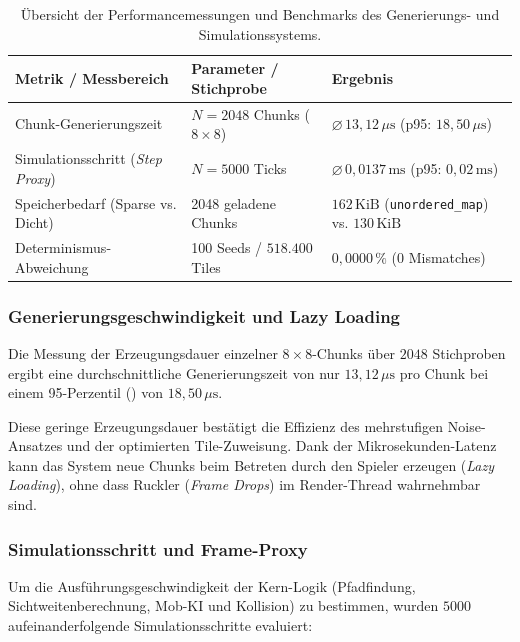 \documentclass[
  a4paper,
  11pt,
  twoside,
  BCOR=8mm,           %
  headings=big,
  numbers=noenddot,
  listof=totoc,       %
  captions=tableheading,
]{scrreprt}
\begin{document}
\begin{table}[htbp]
    \centering
    \caption{Übersicht der Performancemessungen und Benchmarks des Generierungs- und Simulationssystems.}
    \label{tab:performance_summary}
    \small
    \begin{tabular}{|p{3.6cm}|p{4.0cm}|p{5.6cm}|}
        \hline
        \textbf{Metrik / Messbereich} & \textbf{Parameter / Stichprobe} & \textbf{Ergebnis} \\ \hline
        Chunk-Generierungszeit & $N = 2048$ Chunks ($8 \times 8$) & $\varnothing\,13{,}12\,\mu\text{s}$ (p95: $18{,}50\,\mu\text{s}$) \\ \hline
        Simulationsschritt (\textit{Step Proxy}) & $N = 5000$ Ticks & $\varnothing\,0{,}0137\,\text{ms}$ (p95: $0{,}02\,\text{ms}$) \\ \hline
        Speicherbedarf (Sparse vs. Dicht) & 2048 geladene Chunks & $162\,\text{KiB}$ (\texttt{unordered\_map}) vs. $130\,\text{KiB}$ \\ \hline
        Determinismus-Abweichung & 100 Seeds / $518.400$ Tiles & $0{,}0000\,\%$ (0 Mismatches) \\ \hline
    \end{tabular}
\end{table}

\subsubsection{Generierungsgeschwindigkeit und Lazy Loading}
Die Messung der Erzeugungsdauer einzelner $8 \times 8$-Chunks über $2048$ Stichproben ergibt eine durchschnittliche Generierungszeit von nur $13{,}12\,\mu\text{s}$ pro Chunk bei einem 95-Perzentil () von $18{,}50\,\mu\text{s}$. 

Diese geringe Erzeugungsdauer bestätigt die Effizienz des mehrstufigen Noise-Ansatzes und der optimierten Tile-Zuweisung. Dank der Mikrosekunden-Latenz kann das System neue Chunks beim Betreten durch den Spieler erzeugen (\textit{Lazy Loading}), ohne dass Ruckler (\textit{Frame Drops}) im Render-Thread wahrnehmbar sind.

\subsubsection{Simulationsschritt und Frame-Proxy}
Um die Ausführungsgeschwindigkeit der Kern-Logik (Pfadfindung, Sichtweitenberechnung, Mob-KI und Kollision) zu bestimmen, wurden $5000$ aufeinanderfolgende Simulationsschritte evaluiert:
\end{document}
